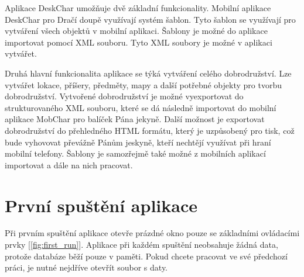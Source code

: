 \documentclass[12pt,a4paper,oneside]{article}
\begin{document}
		\vspace{1cm}		
		
Aplikace DeskChar umožňuje dvě základní funkcionality. Mobilní aplikace DeskChar pro Dračí doupě využívají systém šablon. Tyto šablon se využívají pro vytváření všech objektů v mobilní aplikaci. Šablony je možné do aplikace importovat pomocí XML souboru. Tyto XML soubory je možné v aplikaci vytvářet. \par

Druhá hlavní funkcionalita aplikace se týká vytváření celého dobrodružství. Lze vytvářet lokace, příšery, předměty, mapy a další potřebné objekty pro tvorbu dobrodružství. Vytvořené dobrodružství je možné vyexportovat do strukturovaného XML souboru, které se dá následně importovat do mobilní aplikace MobChar pro balíček Pána jekyně. Další možnost je exportovat dobrodružství do přehledného HTML formátu, který je uzpůsobený pro tisk, což bude vyhovovat převážně Pánům jeskyně, kteří nechtějí využívat při hraní mobilní telefony. Šablony je samozřejmě také možné z mobilních aplikací importovat a dále na nich pracovat. 
		\newpage


	\section{První spuštění aplikace}
Při prvním spuštění aplikace otevře prázdné okno pouze se základními ovládacími prvky [\ref{fig:first_run}]. Aplikace při každém spuštění neobsahuje žádná data, protože databáze běží pouze v paměti. Pokud chcete pracovat ve své předchozí práci, je nutné nejdříve otevřít soubor s daty. 		
				
\end{document}
